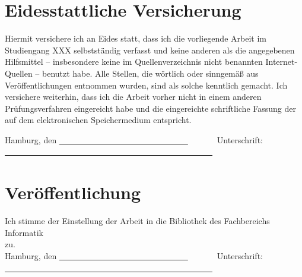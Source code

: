 	\chapter*{Eidesstattliche Versicherung}
\renewcommand*\chapterpagestyle{empty}
Hiermit versichere ich an Eides statt, dass ich die vorliegende Arbeit im Studiengang XXX %
selbstständig verfasst und keine anderen als die angegebenen Hilfsmittel – insbesondere keine im Quellenverzeichnis nicht benannten Internet-Quellen – benutzt habe.
Alle Stellen, die wörtlich oder sinngemäß aus Veröffentlichungen entnommen wurden, sind als solche kenntlich gemacht. 
Ich versichere weiterhin, dass ich die Arbeit vorher nicht in einem anderen Prüfungsverfahren eingereicht habe und die eingereichte schriftliche Fassung der auf dem elektronischen Speichermedium entspricht.
\vspace{1cm} 

\noindent Hamburg, den \uline{~~~~~~~~~~~~~~~~~~~~~~~~~~~~~~~}~~~~~~~Unterschrift: \uline{~~~~~~~~~~~~~~~~~~~~~~~~~~~~~~~~~~~~~~~~~~~~~~~~~~} 

\let \cleardoublepage \clearpage

\noindent\begin{minipage}{\textwidth}
	
\vspace{1cm} 
\chapter*{Veröffentlichung}
Ich stimme der Einstellung der Arbeit in die Bibliothek des Fachbereichs Informatik \\zu.
\vspace{1cm}\\ 
\noindent Hamburg, den \uline{~~~~~~~~~~~~~~~~~~~~~~~~~~~~~~~}~~~~~~~Unterschrift: \uline{~~~~~~~~~~~~~~~~~~~~~~~~~~~~~~~~~~~~~~~~~~~~~~~~~~}
\end{minipage}
